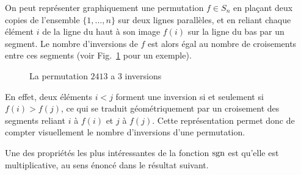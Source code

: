 \documentclass[french,course,oneside,theoremnosection]{lecture}
\begin{document}
\begin{remark}
On peut représenter graphiquement une permutation $f \in S_n$ en plaçant deux copies de l'ensemble $\{1, \ldots, n\}$ sur deux lignes parallèles, et en reliant chaque élément $i$ de la ligne du haut à son image $f(i)$ sur la ligne du bas par un segment. Le nombre d'inversions de $f$ est alors égal au nombre de croisements entre ces segments (voir Fig.~\ref{fig:inv} pour un exemple).
\begin{figure}
\begin{center}
\end{center}\caption{La permutation $2413$ a 3 inversions}\label{fig:inv}
\end{figure}

En effet, deux éléments $i < j$ forment une inversion si et seulement si $f(i) > f(j)$, ce qui se traduit géométriquement par un croisement des segments reliant $i$ à $f(i)$ et $j$ à $f(j)$. Cette représentation permet donc de compter visuellement le nombre d'inversions d'une permutation.
\end{remark}

Une des propriétés les plus intéressantes de la fonction $\operatorname{sgn}$ est qu'elle est multiplicative, au sens énoncé dans le résultat suivant.
\end{document}

